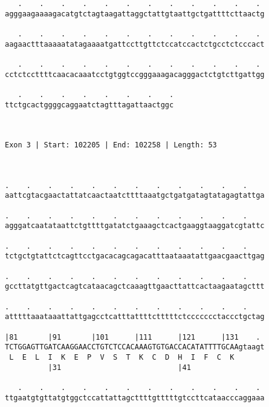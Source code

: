 \documentclass{article}
\begin{document}
\begin{Verbatim}
   .    .    .    .    .    .    .    .    .    .    .    . 
agggaagaaaagacatgtctagtaagattaggctattgtaattgctgattttcttaactg
                                                            
   .    .    .    .    .    .    .    .    .    .    .    . 
aagaactttaaaaatatagaaaatgattccttgttctccatccactctgcctctcccact
                                                            
   .    .    .    .    .    .    .    .    .    .    .    . 
cctctccttttcaacacaaatcctgtggtccgggaaagacagggactctgtcttgattgg
                                                            
   .    .    .    .    .    .    .    .
ttctgcactggggcaggaatctagtttagattaactggc
                                       
                                       
 
Exon 3 | Start: 102205 | End: 102258 | Length: 53



.    .    .    .    .    .    .    .    .    .    .    .    
aattcgtacgaactattatcaactaatcttttaaatgctgatgatagtatagagtattga
                                                            
.    .    .    .    .    .    .    .    .    .    .    .    
agggatcaatataattctgttttgatatctgaaagctcactgaaggtaaggatcgtattc
                                                            
.    .    .    .    .    .    .    .    .    .    .    .    
tctgctgtattctcagttcctgacacagcagacatttaataaatattgaacgaacttgag
                                                            
.    .    .    .    .    .    .    .    .    .    .    .    
gccttatgttgactcagtcataacagctcaaagttgaacttattcactaagaatagcttt
                                                            
.    .    .    .    .    .    .    .    .    .    .    .    
atttttaaataaattattgagcctcatttattttctttttctccccccctaccctgctag
                                                            
|81       |91       |101      |111      |121      |131    . 
TCTGGAGTTGATCAAGGAACCTGTCTCCACAAAGTGTGACCACATATTTTGCAAgtaagt
 L  E  L  I  K  E  P  V  S  T  K  C  D  H  I  F  C  K       
          |31                           |41                 
  
   .    .    .    .    .    .    .    .    .    .    .    . 
ttgaatgtgttatgtggctccattattagcttttgtttttgtccttcataacccaggaaa
                                                            

\end{Verbatim}
\end{document}
